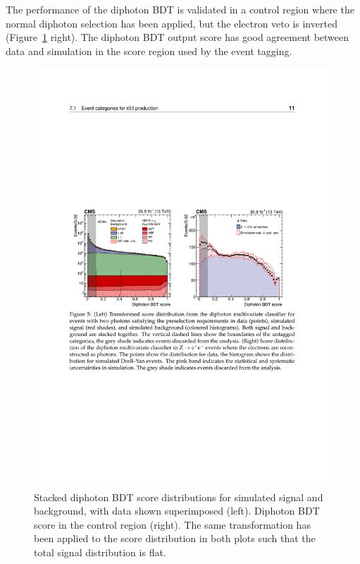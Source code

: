 The performance of the diphoton BDT is validated in a \Zee control region where the normal diphoton selection has been applied, but the electron veto is inverted (Figure~\ref{fig:event_categorisaton:diphoton_bdt} right). The diphoton BDT output score has good agreement between data and simulation in the score region used by the event tagging.
\begin{figure}[h!]
    \centering
        \includegraphics[width=0.99\textwidth]{figures/event_selection/diphoton_BDT.pdf}
    \caption{Stacked diphoton BDT score distributions for simulated signal and background, with data shown superimposed (left). Diphoton BDT score in the \Zee control region (right). 
             The same transformation has been applied to the score distribution in both plots such that the total signal distribution is flat.}
        \label{fig:event_categorisaton:diphoton_bdt}
\end{figure}


